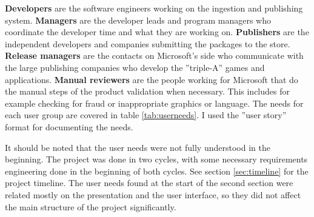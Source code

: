 \documentclass[english,12pt,a4paper,pdftex,sci,utf8]{aaltothesis}
\begin{document}
\textbf{Developers}  are the software engineers working on the ingestion and publishing system.
\textbf{Managers}  are the developer leads and program managers who coordinate the developer time and what they are working on.
\textbf{Publishers} are the independent developers and companies submitting the packages to the store.
\textbf{Release managers} are the contacts on Microsoft's side who communicate with the large publishing companies who develop the ''triple-A'' games and applications.
\textbf{Manual reviewers} are the people working for Microsoft that do the manual steps of the product validation when necessary. This includes for example checking for fraud or inappropriate graphics or language.
The needs for each user group are covered in table \ref{tab:userneeds}.
I used the ''user story'' format for documenting the needs.

It should be noted that the user needs were not fully understood in the beginning. The project was done in two cycles, with some necessary requirements engineering done in the beginning of both cycles. See section \ref{sec:timeline} for the project timeline. 
The user needs found at the start of the second section were related mostly on the presentation and the user interface, so they did not affect the main structure of the project significantly.

\end{document}
